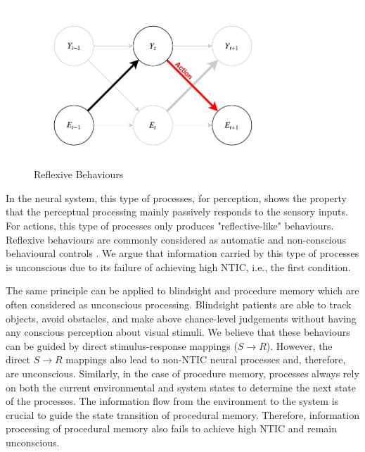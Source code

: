 \documentclass[utf8]{article}
\begin{document}
            	
                
    		\begin{figure}[H]
    			\includegraphics[width=0.8\textwidth]{WritingMaterials/Fig_Reflexive/Reflexive.pdf}
    			\caption{Reflexive Behaviours}
    			\label{fig:reflexive}
    		\end{figure}        
            
            In the neural system, this type of processes, for perception, shows the property that the perceptual processing mainly passively responds to the sensory inputs. For actions, this type of processes only produces "reflective-like" behaviours. Reflexive behaviours are commonly considered as automatic and non-conscious behavioural controls \citep{casali2013theoretically}. We argue that information carried by this type of processes is unconscious due to its failure of achieving high NTIC, i.e., the first condition. 
            
            The same principle can be applied to blindsight and procedure memory  which are often considered as unconscious processing. Blindsight patients are able to track objects, avoid obstacles, and make above chance-level judgements without having any conscious perception about visual stimuli. We believe that these behaviours can be guided by direct stimulus-response mappings ($S\rightarrow{}R$). However, the direct $S\rightarrow{}R$ mappings also lead to non-NTIC neural processes  and, therefore, are unconscious. Similarly, in the case of procedure memory, processes always rely on both the current environmental and system states to determine the next state of the processes. The information flow from the environment to the system is crucial to guide the state transition of procedural memory. Therefore, information processing of procedural memory also fails to achieve high NTIC and remain unconscious. 
            
\end{document}
